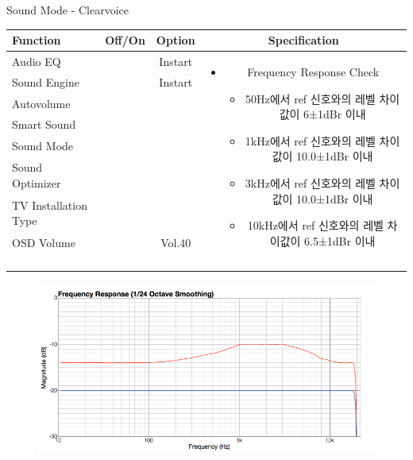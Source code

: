 \begin{frame}[t]{Sound Mode - Clearvoice}
\begin{tiny}
\begin{tabular}{@{}lccc@{}}
\toprule
Function & Off/On & Option & Specification \\
\midrule
Audio EQ & \color{black}{Off} & Instart &
\multirow{10}{60mm}{
\begin{itemize}
\item Frequency Response Check
	\begin{itemize}
	\item 50Hz에서 ref 신호와의 레벨 차이값이 6±1dBr 이내
	\item 1kHz에서 ref 신호와의 레벨 차이값이 10.0±1dBr 이내
	\item 3kHz에서 ref 신호와의 레벨 차이값이 10.0±1dBr 이내
	\item 10kHz에서 ref 신호와의 레벨 차이값이 6.5±1dBr 이내
	\end{itemize}
\end{itemize}
} \\
Sound Engine & \color{blue}{On} & Instart & \\
Autovolume & \color{black}{Off} & & \\
Smart Sound & \color{black}{Off} & & \\
Sound Mode & \color{blue}{On} & \color{blue}{Clearvoice} & \\
Sound Optimizer & \color{black}{Off} & & \\
TV Installation Type & \color{blue}{On} & \color{black}{Standtype1} & \\
OSD Volume & \color{blue}{On} & Vol.40 & \\
& & & \\
& & & \\
& & & \\
& & & \\\midrule
\end{tabular}
\end{tiny}

\begin{figure}[b]
\includegraphics[height=0.4\textwidth]{figures/clearvoice.png}
\end{figure}

\end{frame}


